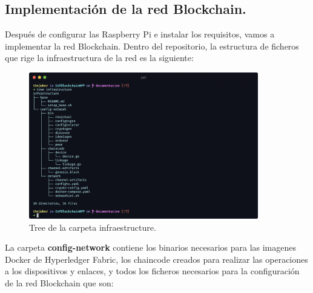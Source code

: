 \newpage

\subsection{Implementación de la red Blockchain.}

Después de configurar las Raspberry Pi e instalar los requisitos, vamos a implementar la red Blockchain.
Dentro del repositorio, la estructura de ficheros que rige la infraestructura de la red es la siguiente:

\begin{figure}[ht!]
  \centering
  \includegraphics[width=10cm]{imagenes/desarrollo/tree_infraestructure}
  \caption{Tree de la carpeta infraestructure.}
  \label{fig:tree-infraestructure}
\end{figure}

\vspace{5mm}

\noindent La carpeta \textbf{config-network} contiene los binarios necesarios para las imagenes Docker de Hyperledger Fabric,
los chaincode creados para realizar las operaciones a los dispositivos y enlaces, y todos los ficheros necesarios para la 
configuración de la red Blockchain que son: 


